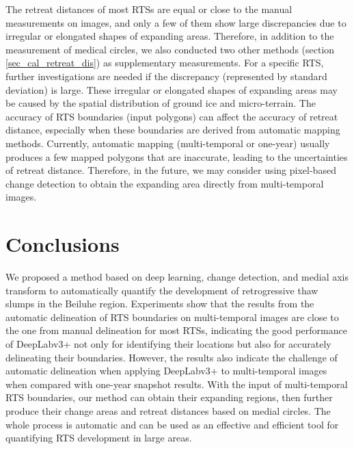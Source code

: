 \documentclass[authoryear,preprint,review,12pt]{elsarticle}
\begin{document}
The retreat distances of most RTSs are equal or close to the manual measurements on images, and only a few of them show large discrepancies due to irregular or elongated shapes of expanding areas. 
Therefore, in addition to the measurement of medical circles, we also conducted two other methods (section \ref{sec_cal_retreat_dis}) %
as supplementary measurements. 
For a specific RTS, further investigations are needed if the discrepancy (represented by standard deviation) is large. 
These irregular or elongated shapes of expanding areas may be caused by the spatial distribution of ground ice and micro-terrain.
The accuracy of RTS boundaries (input polygons) can affect the accuracy of retreat distance, especially when these boundaries are derived from automatic mapping methods. 
Currently, automatic mapping (multi-temporal or one-year) usually produces a few mapped polygons that are inaccurate, leading to the uncertainties of retreat distance. 
Therefore, in the future, we may consider using pixel-based change detection to obtain the expanding area directly from multi-temporal images. 



%


\section{Conclusions}
\label{sec_conclusion}

We proposed a method based on deep learning, change detection, and medial axis transform to automatically quantify the development of retrogressive thaw slumps in the Beiluhe region. 
Experiments show that the results from the automatic delineation of RTS boundaries on multi-temporal images are close to the one from manual delineation for most RTSs, indicating the good performance of DeepLabv3+ not only for identifying their locations but also for accurately delineating their boundaries. 
However, the results also indicate the challenge of automatic delineation when applying DeepLabv3+ to multi-temporal images when compared with one-year snapshot results. 
With the input of multi-temporal RTS boundaries, %
our method can obtain their expanding regions, then further produce their change areas and retreat distances based on medial circles. 
The whole process is automatic and can be used as an effective and efficient tool for quantifying RTS development in large areas. 
\end{document}
